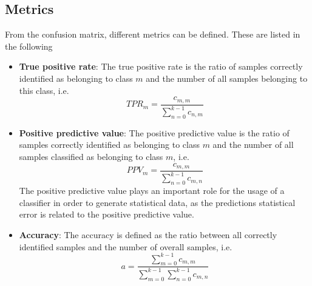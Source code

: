 \subsection{Metrics}

From the confusion matrix, different metrics can be defined. These are listed in the following
\begin{itemize}[label={}]
\item \textbf{True positive rate}: The true positive rate is the ratio of samples correctly identified as belonging to class $m$ and the number of all samples belonging to this class, i.e.
\begin{equation}
TPR_m = \frac{c_{m,m}}{\sum_{n=0}^{k-1} c_{n,m}}
\end{equation}
\item \textbf{Positive predictive value}: The positive predictive value is the ratio of samples correctly identified as belonging to class $m$ and the number of all samples classified as belonging to class $m$, i.e. 
\begin{equation}
PPV_m = \frac{c_{m,m}}{\sum_{n=0}^{k-1} c_{m,n}}
\end{equation} 
The positive predictive value plays an important role for the usage of a classifier in order to generate statistical data, as the predictions statistical error is related to the positive predictive value.
\item \textbf{Accuracy}: The accuracy is defined as the ratio between all correctly identified samples and the number of overall samples, i.e.
%
\begin{equation}
a = \frac{\sum_{m=0}^{k-1} c_{m,m}}{\sum_{m=0}^{k-1} \sum_{n=0}^{k-1} c_{m,n}}
\end{equation} 

\end{itemize}



